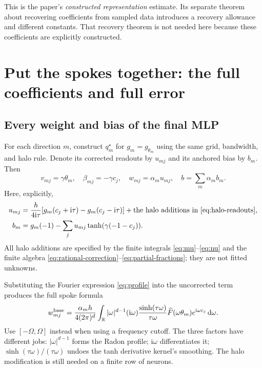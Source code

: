 \documentclass[11pt]{article}
\newcommand{\R}{\mathbb R}
\newcommand{\ii}{\mathrm i}
\newcommand{\dd}{\,\mathrm d}
\begin{document}
This is the paper's \emph{constructed representation} estimate. Its separate theorem about recovering coefficients from sampled data introduces a recovery allowance and different constants. That recovery theorem is not needed here because these coefficients are explicitly constructed.

\section{Put the spokes together: the full coefficients and full error}
\subsection{Every weight and bias of the final MLP}

For each direction $m$, construct $q_m^\star$ for $g_m=g_{\theta_m}$ using the same grid, bandwidth, and halo rule. Denote its corrected readouts by $u_{mj}$ and its anchored bias by $b_m$. Then
\begin{equation}
 \boxed{v_{mj}=\gamma\theta_m,\quad
 \beta_{mj}=-\gamma c_j,\quad w_{mj}=\alpha_m u_{mj},\quad
 b=\sum_m\alpha_m b_m.}
 \label{eq:full-parameters}
\end{equation}
Here, explicitly,
\begin{align}
 u_{mj}&=\frac{h}{4\ii\tau}
 [g_m(c_j+\ii\tau)-g_m(c_j-\ii\tau)]
 +\text{the halo additions in \eqref{eq:halo-readouts}},
 \label{eq:full-coeff}\\
 b_m&=g_m(-1)-\sum_j u_{mj}\tanh(\gamma(-1-c_j)).
\end{align}
All halo additions are specified by the finite integrals \eqref{eq:mu}--\eqref{eq:nu} and the finite algebra \eqref{eq:rational-correction}--\eqref{eq:partial-fractions}; they are not fitted unknowns.

Substituting the Fourier expression \eqref{eq:profile} into the uncorrected term produces the full spoke formula
\begin{equation}
 w_{mj}^{\rm base}=\frac{\alpha_m h}{4(2\pi)^d}
 \int_\R |\omega|^{d-1}(\ii\omega)
 \frac{\sinh(\tau\omega)}{\tau\omega}
 \widehat F(\omega\theta_m)e^{\ii\omega c_j}\dd\omega.
 \label{eq:full-fourier-coeff}
\end{equation}
Use $[-\Omega,\Omega]$ instead when using a frequency cutoff. The three factors have different jobs: $|\omega|^{d-1}$ forms the Radon profile; $\ii\omega$ differentiates it; $\sinh(\tau\omega)/(\tau\omega)$ undoes the tanh derivative kernel's smoothing. The halo modification is still needed on a finite row of neurons.
\end{document}

